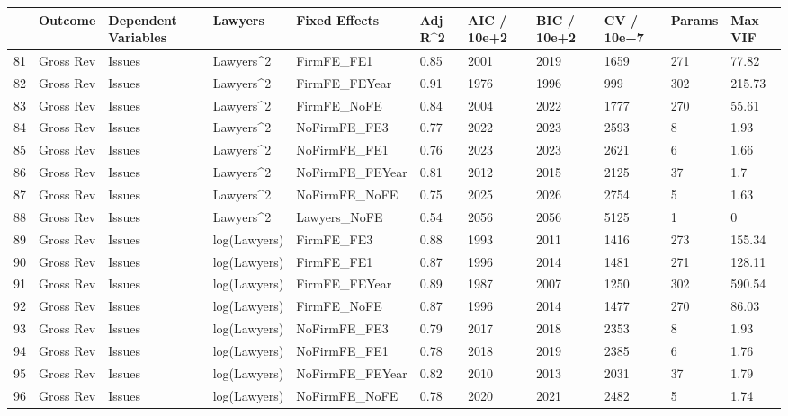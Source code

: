 \begin{table}[ht]
\centering
\begin{tabular}{rllllllllll}
  \hline
 & Outcome & Dependent Variables & Lawyers & Fixed Effects & Adj R^2 & AIC / 10e+2 & BIC / 10e+2 & CV / 10e+7 & Params & Max VIF \\ 
  \hline
81 & Gross Rev & Issues & Lawyers^2 & FirmFE\_FE1 & 0.85 & 2001 & 2019 & 1659 & 271 & 77.82 \\ 
  82 & Gross Rev & Issues & Lawyers^2 & FirmFE\_FEYear & 0.91 & 1976 & 1996 & 999 & 302 & 215.73 \\ 
  83 & Gross Rev & Issues & Lawyers^2 & FirmFE\_NoFE & 0.84 & 2004 & 2022 & 1777 & 270 & 55.61 \\ 
  84 & Gross Rev & Issues & Lawyers^2 & NoFirmFE\_FE3 & 0.77 & 2022 & 2023 & 2593 & 8 & 1.93 \\ 
  85 & Gross Rev & Issues & Lawyers^2 & NoFirmFE\_FE1 & 0.76 & 2023 & 2023 & 2621 & 6 & 1.66 \\ 
  86 & Gross Rev & Issues & Lawyers^2 & NoFirmFE\_FEYear & 0.81 & 2012 & 2015 & 2125 & 37 & 1.7 \\ 
  87 & Gross Rev & Issues & Lawyers^2 & NoFirmFE\_NoFE & 0.75 & 2025 & 2026 & 2754 & 5 & 1.63 \\ 
  88 & Gross Rev & Issues & Lawyers^2 & Lawyers\_NoFE & 0.54 & 2056 & 2056 & 5125 & 1 & 0 \\ 
  89 & Gross Rev & Issues & log(Lawyers) & FirmFE\_FE3 & 0.88 & 1993 & 2011 & 1416 & 273 & 155.34 \\ 
  90 & Gross Rev & Issues & log(Lawyers) & FirmFE\_FE1 & 0.87 & 1996 & 2014 & 1481 & 271 & 128.11 \\ 
  91 & Gross Rev & Issues & log(Lawyers) & FirmFE\_FEYear & 0.89 & 1987 & 2007 & 1250 & 302 & 590.54 \\ 
  92 & Gross Rev & Issues & log(Lawyers) & FirmFE\_NoFE & 0.87 & 1996 & 2014 & 1477 & 270 & 86.03 \\ 
  93 & Gross Rev & Issues & log(Lawyers) & NoFirmFE\_FE3 & 0.79 & 2017 & 2018 & 2353 & 8 & 1.93 \\ 
  94 & Gross Rev & Issues & log(Lawyers) & NoFirmFE\_FE1 & 0.78 & 2018 & 2019 & 2385 & 6 & 1.76 \\ 
  95 & Gross Rev & Issues & log(Lawyers) & NoFirmFE\_FEYear & 0.82 & 2010 & 2013 & 2031 & 37 & 1.79 \\ 
  96 & Gross Rev & Issues & log(Lawyers) & NoFirmFE\_NoFE & 0.78 & 2020 & 2021 & 2482 & 5 & 1.74 \\ 

\end{tabular}
\end{table}
